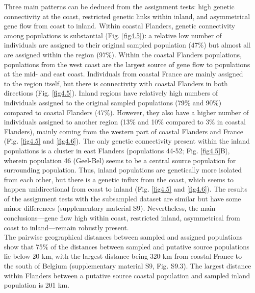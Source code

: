 \documentclass[10pt, twoside]{book} %
\begin{document}
	Three main patterns can be deduced from the assignment tests: high genetic connectivity at the coast, restricted genetic links within inland, and asymmetrical gene flow from coast to inland. Within coastal Flanders, genetic connectivity among populations is substantial (Fig. \ref{fig4.5}): a relative low number of individuals are assigned to their original sampled population (47$\%$) but almost all are assigned within the region (97$\%$). Within the coastal Flanders populations, populations from the west coast are the largest source of gene flow to populations at the mid- and east coast. Individuals from coastal France are mainly assigned to the region itself, but there is connectivity with coastal Flanders in both directions (Fig. \ref{fig4.5}). Inland regions have relatively high numbers of individuals assigned to the original sampled populations (79$\%$ and 90$\%$) compared to coastal Flanders (47$\%$). However, they also have a higher number of individuals assigned to another region (13$\%$ and 10$\%$ compared to 3$\%$ in coastal Flanders), mainly coming from the western part of coastal Flanders and France (Fig. \ref{fig4.5} and \ref{fig4.6}). The only genetic connectivity present within the inland populations is a cluster in east Flanders (populations 44-52; Fig. \ref{fig4.5}B), wherein population 46 (Geel-Bel) seems to be a central source population for surrounding population. Thus, inland populations are genetically more isolated from each other, but there is a genetic influx from the coast, which seems to happen unidirectional from coast to inland (Fig. \ref{fig4.5} and \ref{fig4.6}). The results of the assignment tests with the subsampled dataset are similar but have some minor differences (supplementary material S9). Nevertheless, the main conclusions---gene flow high within coast, restricted inland, asymmetrical from coast to inland---remain robustly present.\\
	
	The pairwise geographical distances between sampled and assigned populations show that 75$\%$ of the distances between sampled and putative source populations lie below 20 km, with the largest distance being 320 km from coastal France to the south of Belgium (supplementary material S9, Fig. S9.3). The largest distance within Flanders between a putative source coastal population and sampled inland population is 201 km.\\
	
\end{document}

